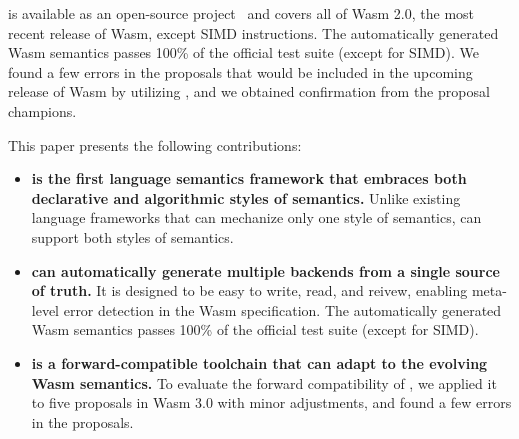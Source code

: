 \spectec is available as an open-source project~\cite{spectec}
and covers all of Wasm 2.0, the most recent release of Wasm,
except SIMD instructions.
The automatically generated Wasm semantics passes
100\% of the official test suite (except for SIMD).
We found a few errors in the proposals
that would be included in the upcoming release of Wasm by utilizing \spectec,
and we obtained confirmation from the proposal champions.

This paper presents the following contributions:
\begin{itemize}
\item \textbf{\spectec is the first language semantics framework that
embraces both declarative and algorithmic styles of semantics.}
Unlike existing language frameworks that can mechanize only one style of semantics,
\spectec can support both styles of semantics.

\item \textbf{\spectec can automatically generate multiple backends from 
a single source of truth.}
It is designed to be easy to write, read, and reivew, enabling
meta-level error detection in the Wasm specification.
The automatically generated Wasm semantics passes
100\% of the official test suite (except for SIMD).


\item \textbf{\spectec is a forward-compatible toolchain that can
adapt to the evolving Wasm semantics.}
To evaluate the forward compatibility of \spectec, we applied it to five proposals
in Wasm 3.0 with minor adjustments, and found a few errors in the proposals.
\end{itemize}
